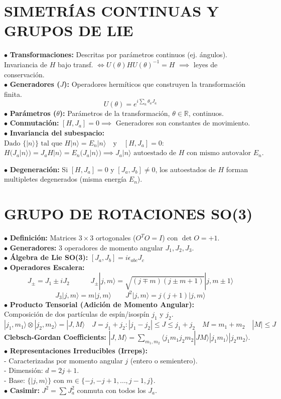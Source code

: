 \section{SIMETRÍAS CONTINUAS Y GRUPOS DE LIE}
$\bullet$ \textbf{Transformaciones:} Descritas por parámetros continuos (ej. ángulos).\\ Invariancia de $H$ bajo transf. $\Leftrightarrow U(\theta) HU(\theta)^{-1} = H$  $\implies$ leyes de conservación.\\
$\bullet$ \textbf{Generadores ($J$):} Operadores hermíticos que construyen la transformación finita.
$$ U(\theta) = e^{i \sum_a \theta_a J_a} $$
$\bullet$ \textbf{Parámetros ($\theta$):} Parámetros de la transformación, $\theta \in \mathbb{R}$, continuos.\\
$\bullet$ \textbf{Conmutación:} $[H, J_a] = 0 \implies$ Generadores son constantes de movimiento.\\

$\bullet$  \textbf{Invariancia del subespacio:} $\text{Dado } \{|n\rangle\} \text{ tal que } H|n\rangle = E_n|n\rangle \quad \text{y} \quad [H, J_a] = 0:$ \\
$H(J_a|n\rangle) = J_a H |n\rangle = E_n (J_a|n\rangle) \implies J_a|n\rangle \text{ autoestado de } H \text{ con mismo autovalor } E_n.$

$\bullet$ \textbf{Degeneración:} Si $[H, J_a] = 0$ y $[J_a, J_b] \neq 0$, los autoestados de $H$ forman multipletes degenerados (misma energía $E_n$).

\section{GRUPO DE ROTACIONES SO(3)}
$\bullet$ \textbf{Definición:} Matrices $3\times3$ ortogonales ($O^TO=I$) con $\det O = +1$.\\
$\bullet$ \textbf{Generadores:} 3 operadores de momento angular $J_1, J_2, J_3$.\\
$\bullet$ \textbf{Álgebra de Lie SO(3):} $ [J_a, J_b] = i \epsilon_{abc} J_c $\\
$\bullet$ \textbf{Operadores Escalera:}
$$ J_\pm = J_1 \pm i J_2 \quad \qquad J_\pm |j,m\rangle = \sqrt{(j \mp m)(j \pm m + 1)} |j, m \pm 1\rangle $$\vspace{-2pt}
$$J_3 |j,m\rangle = m | j,m\rangle \qquad J^2|j,m\rangle = j(j+1)|j,m\rangle$$
$\bullet$ \textbf{Producto Tensorial (Adición de Momento Angular):}\\
Composición de dos partículas de espín/isospín $j_1$ y $j_2$.
$$|j_1, m_1\rangle \otimes |j_2, m_2\rangle = |J,M\rangle \quad {J} = j_1 + j_2: |j_1-j_2| \le J \le j_1+j_2 \quad M = m_1+m_2\quad |M|\leq J$$
\textbf{Clebsch-Gordan Coefficients:} $|J,M\rangle = \sum_{m_1,m_2} \langle j_1 m_1 j_2 m_2 | J M \rangle |j_1 m_1\rangle |j_2 m_2\rangle$.\\
$\bullet$ \textbf{Representaciones Irreducibles (Irreps):} \\
- Caracterizadas por momento angular $j$ (entero o semientero). \\ 
- Dimensión: $d = 2j+1$.\\
- Base: $\{|j,m\rangle\}$ con $m \in \{-j, -j+1, \dots, j-1, j\}$.\\
$\bullet$ \textbf{Casimir:} $J^2 = \sum J_a^2$ conmuta con todos los $J_a$.


